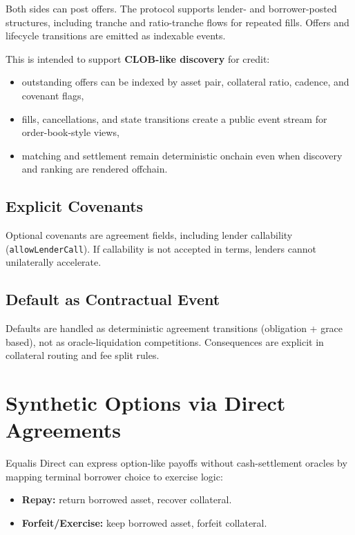 \documentclass[version=preprint]{iacrcc}
\begin{document}
Both sides can post offers. The protocol supports lender- and borrower-posted structures, including tranche and ratio-tranche flows for repeated fills. Offers and lifecycle transitions are emitted as indexable events.

This is intended to support \textbf{CLOB-like discovery} for credit:
\begin{itemize}
  \item outstanding offers can be indexed by asset pair, collateral ratio, cadence, and covenant flags,
  \item fills, cancellations, and state transitions create a public event stream for order-book-style views,
  \item matching and settlement remain deterministic onchain even when discovery and ranking are rendered offchain.
\end{itemize}

\subsection{Explicit Covenants}

Optional covenants are agreement fields, including lender callability (\texttt{allowLenderCall}). If callability is not accepted in terms, lenders cannot unilaterally accelerate.

\subsection{Default as Contractual Event}

Defaults are handled as deterministic agreement transitions (obligation + grace based), not as oracle-liquidation competitions. Consequences are explicit in collateral routing and fee split rules.

\section{Synthetic Options via Direct Agreements}

Equalis Direct can express option-like payoffs without cash-settlement oracles by mapping terminal borrower choice to exercise logic:
\begin{itemize}
  \item \textbf{Repay:} return borrowed asset, recover collateral.
  \item \textbf{Forfeit/Exercise:} keep borrowed asset, forfeit collateral.
\end{itemize}
\end{document}
